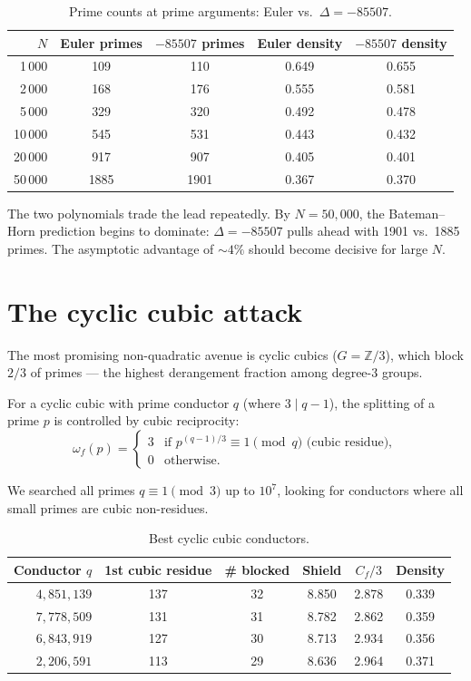 \documentclass[11pt,a4paper]{article}
\theoremstyle{definition}
\theoremstyle{remark}
\newcommand{\Z}{\mathbb{Z}}
\begin{document}
\begin{table}[ht]
\centering
\caption{Prime counts at prime arguments: Euler vs.\ $\Delta = -85507$.}
\label{tab:crossover}
\medskip
\begin{tabular}{rcccc}
\toprule
$N$ & Euler primes & $-85507$ primes & Euler density & $-85507$ density \\
\midrule
1\,000 & 109 & 110 & 0.649 & 0.655 \\
2\,000 & 168 & 176 & 0.555 & 0.581 \\
5\,000 & 329 & 320 & 0.492 & 0.478 \\
10\,000 & 545 & 531 & 0.443 & 0.432 \\
20\,000 & 917 & 907 & 0.405 & 0.401 \\
50\,000 & 1885 & 1901 & 0.367 & 0.370 \\
\bottomrule
\end{tabular}
\end{table}

The two polynomials trade the lead repeatedly.
By $N = 50{,}000$, the Bateman--Horn prediction begins to dominate: $\Delta = -85507$ pulls ahead with 1901 vs.\ 1885 primes.
The asymptotic advantage of $\sim\!4\%$ should become decisive for large $N$.


\section{The cyclic cubic attack}\label{sec:cubic}

The most promising non-quadratic avenue is cyclic cubics ($G = \Z/3$), which block $2/3$ of primes --- the highest derangement fraction among degree-3 groups.

For a cyclic cubic with prime conductor $q$ (where $3 \mid q-1$), the splitting of a prime $p$ is controlled by cubic reciprocity:
\[
\omega_f(p) = \begin{cases} 3 & \text{if } p^{(q-1)/3} \equiv 1 \pmod{q} \text{ (cubic residue)}, \\ 0 & \text{otherwise}. \end{cases}
\]

We searched all primes $q \equiv 1 \pmod{3}$ up to $10^7$, looking for conductors where all small primes are cubic non-residues.

\begin{table}[ht]
\centering
\caption{Best cyclic cubic conductors.}
\label{tab:cubic}
\medskip
\begin{tabular}{rccccc}
\toprule
Conductor $q$ & 1st cubic residue & \# blocked & Shield & $C_f/3$ & Density \\
\midrule
$4{,}851{,}139$ & 137 & 32 & 8.850 & 2.878 & 0.339 \\
$7{,}778{,}509$ & 131 & 31 & 8.782 & 2.862 & 0.359 \\
$6{,}843{,}919$ & 127 & 30 & 8.713 & 2.934 & 0.356 \\
$2{,}206{,}591$ & 113 & 29 & 8.636 & 2.964 & 0.371 \\
\bottomrule
\end{tabular}
\end{table}
\end{document}
